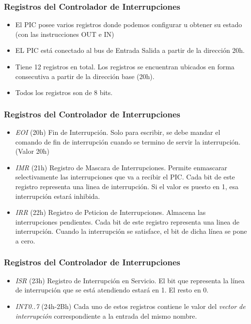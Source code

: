 \documentclass{beamer}
\begin{document}
\begin{frame}
\frametitle{Registros del Controlador de Interrupciones}

\begin{itemize}
 \item El PIC posee varios registros donde podemos configurar u obtener su estado (con las instrucciones OUT e IN)
 \item EL PIC está conectado al bus de Entrada Salida a partir de la dirección 20h.
 \item Tiene 12 registros en total. Los registros se encuentran ubicados en forma consecutiva a partir de la dirección base (20h).
 \item Todos los registros son de 8 bits.
\end{itemize}
\end{frame}

\begin{frame}
\frametitle{Registros del Controlador de Interrupciones}

\begin{itemize}
 \item \emph{EOI} (20h) Fin de Interrupción. Solo para escribir, se debe mandar el comando de fin de interrupción cuando se termino de servir la interrupción. (Valor 20h)
 \item \emph{IMR} (21h) Registro de Mascara de Interrupciones. Permite enmascarar selectivamente las interrupciones que va a recibir el PIC. Cada bit de este registro representa una linea de interrupción. Si el valor es puesto en 1, esa interrupción estará inhibida.
 \item \emph{IRR} (22h) Registro de Peticion de Interrupciones. Almacena las interrupciones pendientes. Cada bit de este registro representa una linea de interrupción. Cuando la interrupción se satisface, el bit de dicha línea se pone a cero.
\end{itemize}

\end{frame}


\begin{frame}
\frametitle{Registros del Controlador de Interrupciones}

\begin{itemize}
 \item \emph{ISR} (23h) Registro de Interrupción en Servicio. El bit que representa la línea de interrupción que se está atendiendo estará en 1. El resto en 0.
 \item \emph{INT0..7} (24h-2Bh) Cada uno de estos registros contiene le valor del \emph{vector de interrupción} correspondiente a la entrada del mismo nombre.
\end{itemize}

\end{frame}
\end{document}
